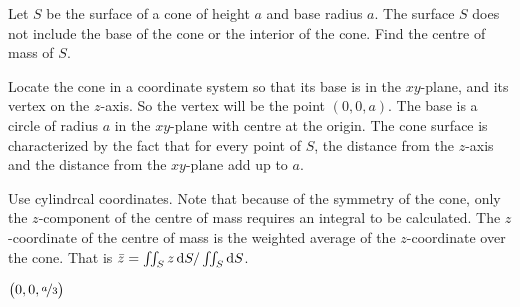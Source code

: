 \begin{question}[M317 2008D] %
Let $S$ be the surface of a cone of height $a$ and base radius $a$. 
The surface $S$ does not include the base of the cone or the interior 
of the cone. Find the centre of mass of $S$.

Locate the cone in a coordinate system so that its base is in the 
$xy$-plane, and its vertex on the $z$-axis. So the vertex will 
be the point $(0, 0, a)$. The base is a circle of radius $a$ in the 
$xy$-plane with centre at the origin. The cone surface is characterized
by the fact that for every point of $S$, the distance from the $z$-axis 
and the distance from the $xy$-plane add up to $a$.

\end{question}

\begin{hint} 
Use cylindrcal coordinates. Note that because of the symmetry of the cone, 
only the $z$-component of the centre of mass requires an integral 
to be calculated. The $z$-coordinate of the centre of mass is 
the weighted average of the $z$-coordinate over the cone. That is
$\bar z =\iint_S z\,\mathrm{d}S/\iint_S\mathrm{d}S$.
\end{hint}

\begin{answer} 
$\big(0,0,\nicefrac{a}{3}\big)$
\end{answer}

